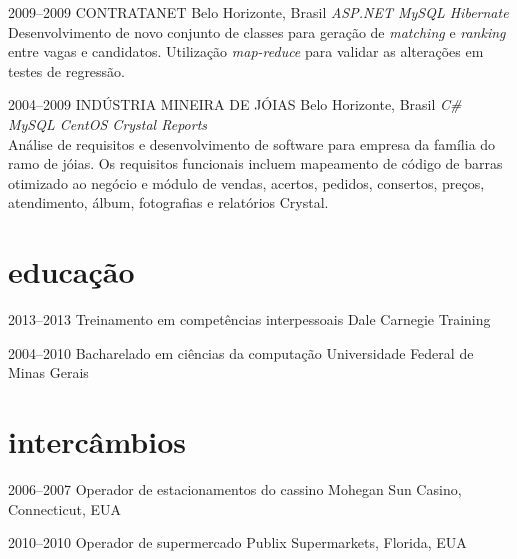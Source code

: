 \documentclass[]{friggeri-cv}
\begin{document}
\begin{entrylist}
\entry
{2009--2009}
{CONTRATANET}
{Belo Horizonte, Brasil}
{\emph{\bullet ASP.NET \bullet MySQL \bullet Hibernate } \\ Desenvolvimento de novo conjunto de classes para geração de \textit{matching} e \textit{ranking} entre vagas e candidatos. Utilização \textit{map-reduce} para validar as alterações em testes de regressão. }


%
 \entry
 {2004--2009}
 {INDÚSTRIA MINEIRA DE JÓIAS}
 {Belo Horizonte, Brasil}
 {\emph{\bullet C\# \bullet MySQL \bullet CentOS \bullet Crystal Reports } \\ Análise de requisitos e desenvolvimento de software para empresa da família do ramo de jóias. Os requisitos funcionais incluem mapeamento de código de barras otimizado ao negócio e módulo de vendas, acertos, pedidos, consertos, preços, atendimento, álbum, fotografias e relatórios Crystal.}
%

\end{entrylist}



\section{educação}

\begin{entrylist}


\entry
{2013--2013}
{Treinamento {\normalfont em competências interpessoais}}
{Dale Carnegie Training}

\entry
{2004--2010}
{Bacharelado {\normalfont em ciências da computação}}
{Universidade Federal de Minas Gerais}



\end{entrylist}


\section{intercâmbios} 

\begin{entrylist}

\entry
{2006--2007}
{Operador {\normalfont de estacionamentos do cassino}}
{Mohegan Sun Casino, Connecticut, EUA}

\entry
{2010--2010} 
{Operador {\normalfont de supermercado}}
{Publix Supermarkets, Florida, EUA}

\end{entrylist}
\end{document}

